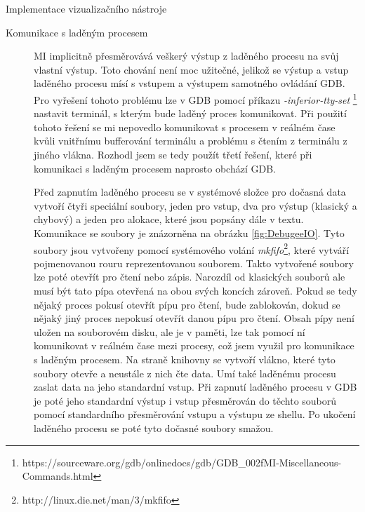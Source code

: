 \documentclass[bc,male,python,dept460]{diploma}						%
\newcommand{\parspace}[1][]{
	\ifthenelse{\isempty{#1}}{\vspace{5mm}}{\vspace{#1}}
	\par
}
\begin{document}
\begin{section}{Implementace vizualizačního nástroje}
\begin{description}
			\item[Komunikace s laděným procesem]
			MI implicitně přesměrovává veškerý výstup z laděného procesu na svůj vlastní výstup. Toto chování není moc užitečné, jelikož se výstup a vstup laděného
			procesu mísí s vstupem a výstupem samotného ovládání GDB. Pro vyřešení tohoto problému lze v GDB pomocí příkazu \textit{-inferior-tty-set}
			\footnote{https://sourceware.org/gdb/onlinedocs/gdb/GDB\_002fMI-Miscellaneous-Commands.html} nastavit terminál, s kterým bude laděný proces komunikovat.
			Při použití tohoto řešení se mi nepovedlo komunikovat s procesem v reálném čase kvůli vnitřnímu bufferování terminálu a problému s čtením z terminálu z
			jiného vlákna. %
			Rozhodl jsem se tedy použít třetí řešení, které při komunikaci s laděným procesem naprosto obchází GDB.
			
			\parspace Před zapnutím laděného procesu se v systémové složce pro dočasná data vytvoří čtyři speciální soubory, jeden pro vstup, dva pro výstup
			(klasický a chybový) a jeden pro alokace, které jsou popsány dále v textu. Komunikace se soubory je znázorněna na obrázku \ref{fig:DebugeeIO}.
			Tyto soubory jsou vytvořeny pomocí systémového volání \textit{mkfifo}\footnote{http://linux.die.net/man/3/mkfifo}, které vytváří pojmenovanou rouru
			reprezentovanou souborem. Takto vytvořené soubory lze poté otevřít pro čtení nebo zápis. Narozdíl od klasických souborů ale musí být tato pípa otevřená na
			obou svých koncích zároveň. Pokud se tedy nějaký proces pokusí otevřít pípu pro čtení, bude zablokován, dokud se nějaký jiný proces nepokusí otevřít danou
			pípu pro čtení. Obsah pípy není uložen na souborovém disku, ale je v paměti, lze tak pomocí ní komunikovat v reálném čase mezi procesy, což jsem využil
			pro komunikace s laděným procesem. Na straně knihovny se vytvoří vlákno, které tyto soubory otevře a neustále z nich čte data. Umí také laděnému procesu
			zaslat data na jeho standardní vstup. Při zapnutí laděného procesu v GDB je poté jeho standardní výstup i vstup přesměrován do těchto souborů pomocí
			standardního přesměrování vstupu a výstupu ze shellu. %
			Po ukočení laděného procesu se poté tyto dočasné soubory smažou.
			

\end{description}
\end{section}
\end{document}
